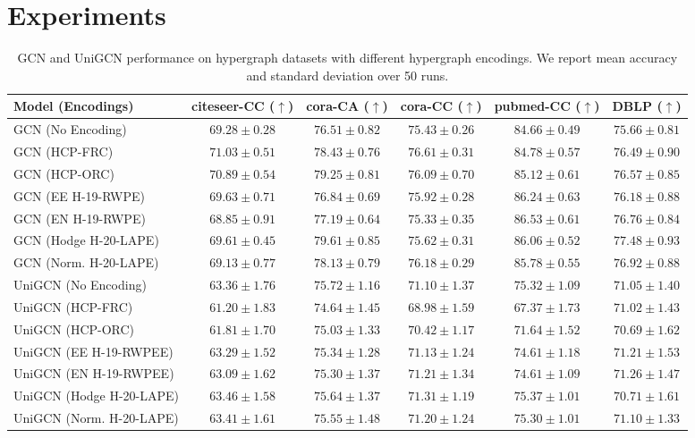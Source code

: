 \section{Experiments}
\label{experiments}

\begin{table*}[t!]
\centering
\tiny
\begin{tabular}{|l|c|c|c|c|c|}
\hline
\textbf{Model (Encodings)} & \textbf{citeseer-CC} ($\uparrow$) & \textbf{cora-CA} ($\uparrow$) & \textbf{cora-CC} ($\uparrow$) & \textbf{pubmed-CC} ($\uparrow$) & \textbf{DBLP} ($\uparrow$) \\
\hline
GCN (No Encoding) & $69.28 \pm 0.28$ & $76.51 \pm 0.82$ & $75.43 \pm 0.26$ & $84.66 \pm 0.49$ & $75.66 \pm 0.81$ \\
GCN (HCP-FRC) & $\mathbf{71.03 \pm 0.51}$ & $78.43 \pm 0.76$ & $\mathbf{76.61 \pm 0.31}$ & $84.78 \pm 0.57$ & $76.49 \pm 0.90$ \\
GCN (HCP-ORC) & $70.89 \pm 0.54$ & $79.25 \pm 0.81$ & $76.09 \pm 0.70$ & $85.12 \pm 0.61$ & $76.57 \pm 0.85$ \\
GCN (EE H-19-RWPE) & $69.63 \pm 0.71$ & $76.84 \pm 0.69$ & $75.92 \pm 0.28$ & $86.24 \pm 0.63$ & $76.18 \pm 0.88$ \\
GCN (EN H-19-RWPE) & $68.85 \pm 0.91$ & $77.19 \pm 0.64$ & $75.33 \pm 0.35$ & $\mathbf{86.53 \pm 0.61}$ & $76.76 \pm 0.84$ \\
GCN (Hodge H-20-LAPE) & $69.61 \pm 0.45$ & $\mathbf{79.61 \pm 0.85}$ & $75.62 \pm 0.31$ & $86.06 \pm 0.52$ & $\mathbf{77.48 \pm 0.93}$ \\
GCN (Norm. H-20-LAPE) & $69.13 \pm 0.77$ & $78.13 \pm 0.79$ & $76.18 \pm 0.29$ & $85.78 \pm 0.55$ & $76.92 \pm 0.88$ \\
\hline
UniGCN (No Encoding) & $63.36 \pm 1.76$ & $75.72 \pm 1.16$ & $71.10 \pm 1.37$ & $75.32 \pm 1.09$ & $71.05 \pm 1.40$ \\  
UniGCN (HCP-FRC) & $61.20 \pm 1.83$ & $74.64 \pm 1.45$ & $68.98 \pm 1.59$ & $67.37 \pm 1.73$ & $71.02 \pm 1.43$ \\ 
UniGCN (HCP-ORC) & $61.81 \pm 1.70$ & $75.03 \pm 1.33$ & $70.42 \pm 1.17$ & $71.64 \pm 1.52$ & $70.69 \pm 1.62$ \\
UniGCN (EE H-19-RWPEE) & $63.29 \pm 1.52$ & $75.34 \pm 1.28$ & $71.13 \pm 1.24$ & $74.61 \pm 1.18$ & $71.21 \pm 1.53$ \\  
UniGCN (EN H-19-RWPEE) & $63.09 \pm 1.62$ & $75.30 \pm 1.37$ & $71.21 \pm 1.34$ & $74.61 \pm 1.09$ & $71.26 \pm 1.47$  \\  
UniGCN (Hodge H-20-LAPE) & $63.46 \pm 1.58$ & $75.64 \pm 1.37$ & $71.31 \pm 1.19$ & $75.37 \pm 1.01$ & $70.71 \pm 1.61$ \\  
UniGCN (Norm. H-20-LAPE) & $63.41 \pm 1.61$ & $75.55 \pm 1.48$ & $71.20 \pm 1.24$ & $75.30 \pm 1.01$ & $71.10 \pm 1.33$ \\  
\hline
\end{tabular}
\caption{GCN and UniGCN performance on hypergraph datasets with different hypergraph encodings. We report mean accuracy and standard deviation over 50 runs.}
\label{tab:node}
\end{table*}


